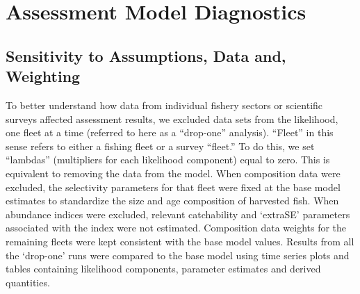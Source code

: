 \documentclass[11pt,
  english,
  a4paper,
]{article}
\begin{document}
\hypertarget{assessment-model-diagnostics}{%
\section{Assessment Model Diagnostics}\label{assessment-model-diagnostics}}

\leavevmode\tagmcend\tagstructend


\hypertarget{sensitivity-to-assumptions-data-and-weighting}{%
\subsection{Sensitivity to Assumptions, Data and, Weighting}\label{sensitivity-to-assumptions-data-and-weighting}}

\leavevmode\tagmcend\tagstructend

To better understand how data from individual fishery sectors or scientific surveys affected assessment results, we excluded data sets from the likelihood, one fleet at a time (referred to here as a ``drop-one'' analysis). ``Fleet'' in this sense refers to either a fishing fleet or a survey ``fleet.'' To do this, we set ``lambdas'' (multipliers for each likelihood component) equal to zero. This is equivalent to removing the data from the model. When composition data were excluded, the selectivity parameters for that fleet were fixed at the base model estimates to standardize the size and age composition of harvested fish. When abundance indices were excluded, relevant catchability and `extraSE' parameters associated with the index were not estimated. Composition data weights for the remaining fleets were kept consistent with the base model values. Results from all the `drop-one' runs were compared to the base model using time series plots and tables containing likelihood components, parameter estimates and derived quantities.
\end{document}
